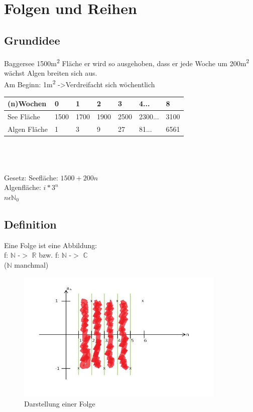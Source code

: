 \documentclass[../mainfile.tex]{subfile}
\author{Barbara Wiedermann}
\begin{document}
	\section{Folgen und Reihen}
	\subsection{Grundidee}
	 	Baggersee 1500m\textsuperscript{2} Fläche er wird so ausgehoben, dass er jede Woche um 200m\textsuperscript{2} wächst Algen breiten sich aus.\\
	 	Am Beginn: 1m\textsuperscript{2} -\textgreater Verdreifacht sich wöchentlich\\
	 	
\begin{tabular}{|l|l|l|l|l|l|l|}
\hline
(n)Wochen    & 0    & 1    & 2    & 3    & 4...    & 8    \\ \hline
See Fläche   & 1500 & 1700 & 1900 & 2500 & 2300... & 3100 \\ \hline
Algen Fläche & 1    & 3    & 9    & 27   & 81...   & 6561 \\ \hline
\end{tabular}\\\\\\
Gesetz: Seefläche: $1500+200n$\\
Algenfläche: $i*3^n$\\
$n \epsilon \mathbb{N}_0$ \\

\subsection{Definition}
Eine Folge ist eine Abbildung: \\
f: $\mathbb{N}$ -$>$ $\mathbb{R}$ bzw. f: $\mathbb{N}$ -$>$ $\mathbb{C}$\\
($\mathbb{N}$ manchmal)\\

\begin{figure}[!htbp]
\centering
\includegraphics[width=10cm]{./bwiedermann/img/Zeichnung.jpg}
\caption{Darstellung einer Folge}
\end{figure}
\end{document}
